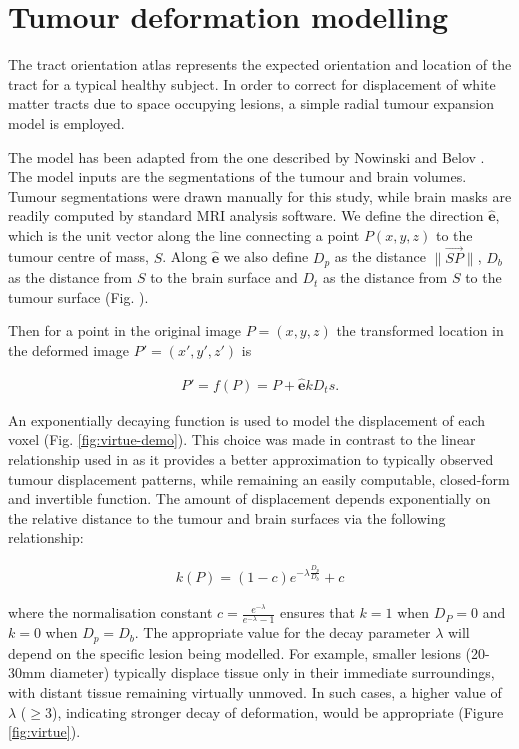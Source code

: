 \section{Tumour deformation modelling}
\label{chapterlabel3}


The tract orientation atlas represents the expected orientation and location of the tract for a typical healthy subject.
In order to correct for displacement of white matter tracts due to space occupying lesions, a simple radial tumour expansion model is employed.

The model has been adapted from the one described by Nowinski and Belov \citep{Nowinski2005}.
The model inputs are the segmentations of the tumour and brain volumes.
Tumour segmentations were drawn manually for this study, while brain masks are readily computed by standard MRI analysis software.
We define the direction $\mathbf{\hat{e}}$, which is the unit vector along the line connecting a point $P(x,y,z)$ to the tumour centre of mass, $S$.
Along $\mathbf{\hat{e}}$ we also define $D_p$ as the distance  $\|\overrightarrow{SP}\|$, $D_b$ as the distance from $S$ to the brain surface and $D_t$ as the distance from $S$ to the tumour surface (Fig. ).

Then for a point in the original image $P = (x,y,z)$ the transformed location in the deformed image $P' = (x',y',z')$ is

\begin{align}\label{eq:forwardP}
  P' = f(P) = P + \mathbf{\hat{e}}kD_ts.
\end{align}

An exponentially decaying function is used to model the displacement of each voxel (Fig. \ref{fig:virtue-demo}).
This choice was made in contrast to the linear relationship used in \citep{Nowinski2005} as it provides a better approximation to typically observed tumour displacement patterns, while remaining an easily computable, closed-form and invertible function.
The amount of displacement depends exponentially on the relative distance to the tumour and brain surfaces via the following relationship:

\begin{align}\label{eq:forwardk}
  k(P) = (1-c)e^{-\lambda \frac{D_p}{D_b}} +c
\end{align}

where the normalisation constant $ c = \frac{e^{-\lambda}}{e^{-\lambda}-1} $ ensures that $k = 1$ when $D_P = 0$ and $k = 0$ when $D_p = D_b$. The appropriate value for the decay parameter $\lambda$ will depend on the specific lesion being modelled. For example, smaller lesions (20-30mm diameter) typically displace tissue only in their immediate surroundings, with distant tissue remaining virtually unmoved. In such cases, a higher value of $\lambda$ ($\geq 3$), indicating stronger decay of deformation, would be appropriate (Figure \ref{fig:virtue}).

